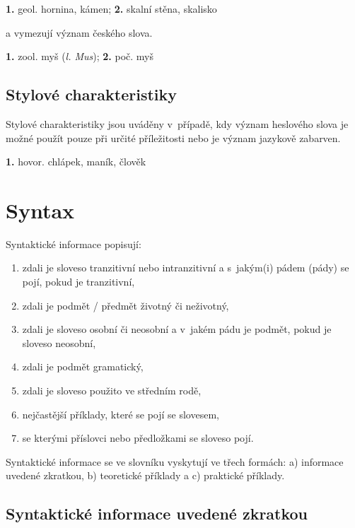 \blspace
  \dicEntry {}   {\textbf{1.}} {\footnotesize{geol.}} {hornina, kámen;} {\textbf{2.}}  {skalní stěna, skalisko}
\blspace

a vymezují význam českého slova.

\blspace
  \dicEntry {}   {\textbf{1.}} {\footnotesize{zool.}} {myš} (\textit{l. Mus}); {\textbf{2.}} {\footnotesize{poč.}} {myš}
\blspace

\subsection*{Stylové charakteristiky}

Stylové charakteristiky jsou uváděny v~případě, kdy význam heslového slova je možné použít pouze při určité příležitosti nebo je význam jazykově zabarven.

\blspace
  \dicEntry {}   {\textbf{1.}} {\footnotesize{hovor.}} {chlápek, maník, člověk}
\blspace

\section{Syntax}

Syntaktické informace popisují:

\begin{enumerate}
\item zdali je sloveso tranzitivní nebo intranzitivní a s~jakým(i) pádem (pády) se pojí, pokud je tranzitivní,
\item zdali je podmět / předmět životný či neživotný,
\item zdali je sloveso osobní či neosobní a v~jakém pádu je podmět, pokud je sloveso neosobní,
\item zdali je podmět gramatický,
\item zdali je sloveso použito ve středním rodě,
\item nejčastější příklady, které se pojí se slovesem,
\item se kterými příslovci nebo předložkami se sloveso pojí.
\end{enumerate}

Syntaktické informace se ve slovníku vyskytují ve třech formách: a) informace uvedené zkratkou, b) teoretické příklady a c) praktické příklady.

\subsection*{Syntaktické informace uvedené zkratkou}

